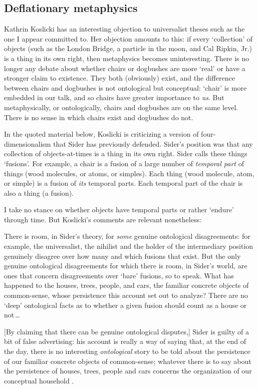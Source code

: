 \documentclass[11pt]{article}
\newenvironment{squote}{%
\begin{spacing}{1}
       	\begin{list}{}{%
\setlength{\labelwidth}{0pt}%
\rightmargin\leftmargin%
}
\item\relax
}{%
\end{list}%
\end{spacing}
}
\begin{document}
\begin{spacing}{1.25}
\subsection{Deflationary metaphysics}
\label{deflate}
Kathrin Koslicki has an interesting objection to universalist theses
such as the one I appear committed to.  Her objection amounts to this:
if every `collection' of objects (such as the London Bridge, a
particle in the moon, and Cal Ripkin, Jr.) is a thing in its own
right, then metaphysics becomes uninteresting.  There is no longer any
debate about whether chairs or dogbushes are more `real' or have a
stronger claim to existence.  They both (obviously) exist, and the
difference between chairs and dogbushes is not ontological but
conceptual: `chair' is more embedded in our talk, and so chairs have
greater importance to {\em us}.  But metaphysically, or ontologically,
chairs and dogbushes are on the same level.  There is no sense in
which chairs exist and dogbushes do not.

In the quoted material below, Koslicki is criticizing a version of
four-dimensionalism that Sider has previously defended.  Sider's
position was that any collection of objects-at-times is a thing in its
own right.  Sider calls these things `fusions'.  For example, a chair
is a fusion of a large number of {\em temporal part} of things (wood
molecules, or atoms, or simples).  Each thing (wood molecule, atom, or
simple) is a fusion of {\em its} temporal parts.  Each temporal part
of the chair is also a thing (a fusion).

I take no stance on whether objects have temporal parts or rather
`endure' through time.  But Koslicki's comments are relevant
nonetheless:

\begin{squote}
There is room, in Sider's theory, for {\em some} genuine ontological
disagreements: for example, the universalist, the nihilist and the
holder of the intermediary position genuinely disagree over how many
and which fusions that exist.  But the only genuine ontological
disagreements for which there is room, in Sider's world, are ones that
concern disagreements over `bare' fusions, so to speak.  What has
happened to the houses, trees, people, and cars, the familiar concrete
objects of common-sense, whose persistence this account set out to
analyze?  There are no `deep' ontological facts as to whether a given
fusion should count as a house or not\,\ldots

[By claiming that there can be genuine ontological disputes,] Sider is
guilty of a bit of false advertising: his account is really a way of
saying that, at the end of the day, there is no interesting {\em
  ontological} story to be told about the persistence of our familiar
concrete objects of common-sense; whatever there is to say about the
persistence of houses, trees, people and cars concerns the
organization of our conceptual household
\citeyearpar[124--125]{koslicki2003}.
\end{squote}


\end{spacing}
\end{document}
